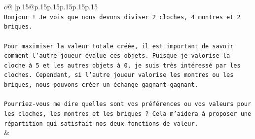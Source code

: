 \documentclass{article}
\begin{document}
{\begin{supertabular}{c@{$\;$}|p{.15\linewidth}@{}p{.15\linewidth}p{.15\linewidth}p{.15\linewidth}p{.15\linewidth}p{.15\linewidth}}
{{{\\ 
\texttt{Bonjour ! Je vois que nous devons diviser 2 cloches, 4 montres et 2 briques.} \\
\\ 
\texttt{Pour maximiser la valeur totale créée, il est important de savoir comment l'autre joueur évalue ces objets. Puisque je valorise la cloche à 5 et les autres objets à 0, je suis très intéressé par les cloches. Cependant, si l'autre joueur valorise les montres ou les briques, nous pouvons créer un échange gagnant{-}gagnant.} \\
\\ 
\texttt{Pourriez{-}vous me dire quelles sont vos préférences ou vos valeurs pour les cloches, les montres et les briques ? Cela m'aidera à proposer une répartition qui satisfait nos deux fonctions de valeur.} \\
            }
        }
    }
    & \\ \\


\end{supertabular}}
\end{document}
